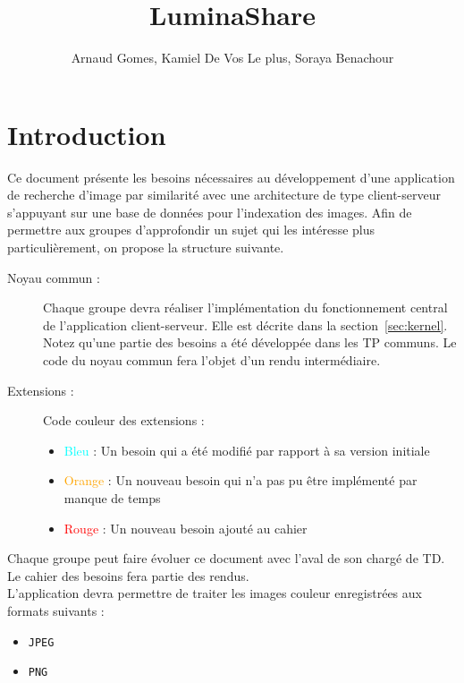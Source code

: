 \documentclass[a4paper,12pt]{article}
\title{\sffamily \textbf{LuminaShare}}
\author{Arnaud Gomes, Kamiel De Vos Le plus, Soraya Benachour}
\date{}
\newcounter{besoin}
\begin{document}
\maketitle


\section{Introduction}

Ce document présente les besoins nécessaires au développement d'une application
de recherche d'image par similarité avec une architecture de type client-serveur s'appuyant sur une base de données pour l'indexation des images.
Afin de permettre aux groupes d'approfondir un sujet qui les intéresse plus
particulièrement, on propose la structure suivante.

\begin{description}
\item[Noyau commun :] Chaque groupe devra réaliser l'implémentation du fonctionnement central de l'application client-serveur. Elle est décrite dans la section~\ref{sec:kernel}. Notez qu'une partie des besoins a été développée dans les TP communs. Le code du noyau commun fera l'objet d'un rendu intermédiaire.
  
\item[Extensions :] Code couleur des extensions : 

\begin{itemize}
  \item \textcolor{cyan}{Bleu} : Un besoin qui a été modifié par rapport à sa version initiale
  \item \textcolor{orange}{Orange} : Un nouveau besoin qui n'a pas pu être implémenté par manque de temps
  \item \textcolor{red}{Rouge} : Un nouveau besoin ajouté au cahier 
\end{itemize}

\end{description}


Chaque groupe peut faire évoluer ce document avec l'aval de son chargé de TD. Le cahier des besoins fera partie des rendus.\\


L'application devra permettre de traiter les images couleur enregistrées aux formats suivants :

\begin{itemize}
\item \verb!JPEG!
\item \verb!PNG!
\end{itemize}
\end{document}
